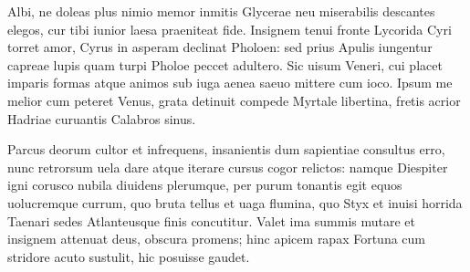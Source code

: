 \documentclass{book}
\newenvironment {carmen} [1] [\relax] 
  {\Titulus \Versus \incipit*\numerus{1}#1}
  {\endVersus}
\newcommand {\Alcaic}    {\Forma \strophae {0 \poena 01 \poena 2}}
\newcommand {\AsclA}     {\Forma \strophae {0 \poena 00 \poena 2}}
\begin{document}
\begin{carmen}[\AsclA]


 Albi, ne doleas plus nimio memor
 inmitis Glycerae neu miserabilis
 descantes elegos, cur tibi iunior
      laesa praeniteat fide.
 Insignem tenui fronte Lycorida               
 Cyri torret amor, Cyrus in asperam
 declinat Pholoen: sed prius Apulis
      iungentur capreae lupis
 quam turpi Pholoe peccet adultero.
 Sic uisum Veneri, cui placet imparis               
 formas atque animos sub iuga aenea
      saeuo mittere cum ioco.
 Ipsum me melior cum peteret Venus,
 grata detinuit compede Myrtale
 libertina, fretis acrior Hadriae               
      curuantis Calabros sinus. 

\end{carmen}

\begin{carmen}[\Alcaic]


 Parcus deorum cultor et infrequens,
 insanientis dum sapientiae
      consultus erro, nunc retrorsum
      uela dare atque iterare cursus
 cogor relictos: namque Diespiter               
 igni corusco nubila diuidens
      plerumque, per purum tonantis
      egit equos uolucremque currum,
 quo bruta tellus et uaga flumina,
 quo Styx et inuisi horrida Taenari               
      sedes Atlanteusque finis
      concutitur. Valet ima summis
 mutare et insignem attenuat deus,
 obscura promens; hinc apicem rapax
       Fortuna cum stridore acuto
      sustulit, hic posuisse gaudet.                

\end{carmen}
\end{document}
